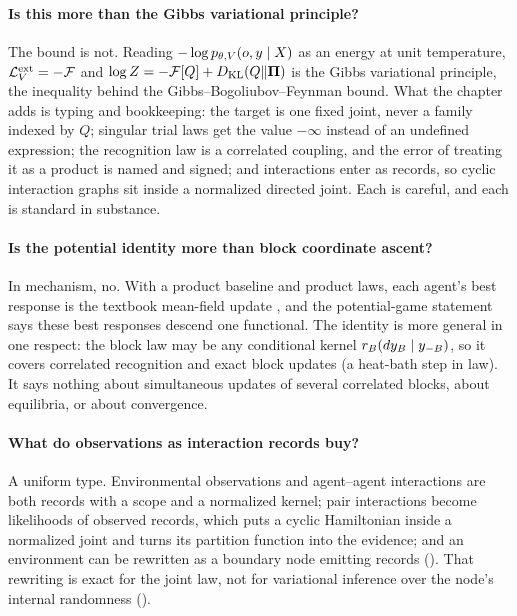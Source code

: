 \paragraph{Is this more than the Gibbs variational principle?}
The bound is not. Reading $-\log p_{\theta,V}(o,y\mid X)$ as an energy at unit temperature,
$\mathcal L^{\mathrm{ext}}_V=-\mathcal F$ and $\log Z=-\mathcal F[Q]+D_{\mathrm{KL}}(Q\Vert\boldsymbol\Pi)$ is the
Gibbs variational principle, the inequality behind the Gibbs--Bogoliubov--Feynman bound. What
the chapter adds is typing and bookkeeping: the target is one fixed joint, never a family
indexed by $Q$; singular trial laws get the value $-\infty$ instead of an undefined expression;
the recognition law is a correlated coupling, and the error of treating it as a product is
named and signed; and interactions enter as records, so cyclic interaction graphs sit inside a
normalized directed joint. Each is careful, and each is standard in substance.

\paragraph{Is the potential identity more than block coordinate ascent?}
In mechanism, no. With a product baseline and product laws, each agent's best response is the
textbook mean-field update \citep{Blei2017}, and the potential-game statement says these best
responses descend one functional. The identity is more general in one respect: the block law may
be any conditional kernel $r_B(dy_B\mid y_{-B})$, so it covers correlated recognition and exact
block updates (a heat-bath step in law). It says nothing about simultaneous updates of several
correlated blocks, about equilibria, or about convergence.

\paragraph{What do observations as interaction records buy?}
A uniform type. Environmental observations and agent--agent interactions are both records with a
scope and a normalized kernel; pair interactions become likelihoods of observed records, which
puts a cyclic Hamiltonian inside a normalized joint and turns its partition function into the
evidence; and an environment can be rewritten as a boundary node emitting records
(). That rewriting is exact for the joint law, not for
variational inference over the node's internal randomness ().

